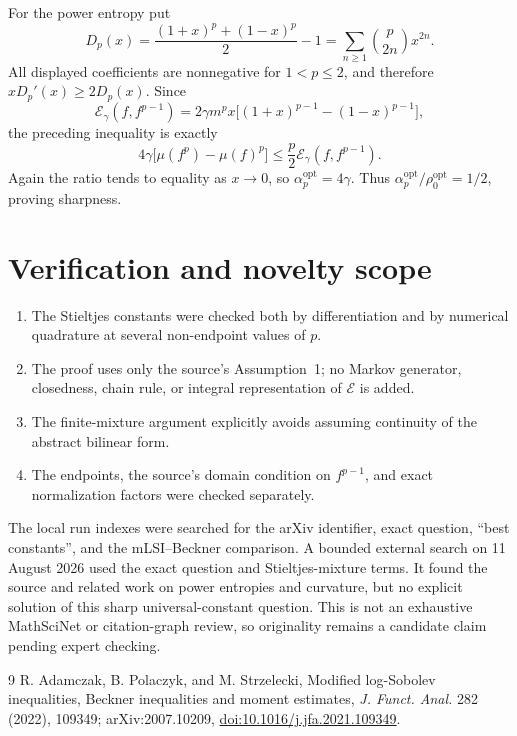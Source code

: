 \documentclass[11pt]{article}
\newcommand{\E}{\mathcal E}
\begin{document}
For the power entropy put
\[
 D_p(x)=\frac{(1+x)^p+(1-x)^p}{2}-1
 =\sum_{n\geq1}\binom p{2n}x^{2n}.
\]
All displayed coefficients are nonnegative for $1<p\leq2$, and therefore
$xD_p'(x)\geq2D_p(x)$. Since
\[
 \E_\gamma(f,f^{p-1})
 =2\gamma m^p x\bigl[(1+x)^{p-1}-(1-x)^{p-1}\bigr],
\]
the preceding inequality is exactly
\[
 4\gamma\bigl[\mu(f^p)-\mu(f)^p\bigr]
 \leq \frac p2\E_\gamma(f,f^{p-1}).
\]
Again the ratio tends to equality as $x\to0$, so
$\alpha_p^{\mathrm{opt}}=4\gamma$. Thus
$\alpha_p^{\mathrm{opt}}/\rho_0^{\mathrm{opt}}=1/2$, proving sharpness.

\section{Verification and novelty scope}

\begin{enumerate}[leftmargin=*,itemsep=0.35em]
 \item The Stieltjes constants were checked both by differentiation and by
 numerical quadrature at several non-endpoint values of $p$.
 \item The proof uses only the source's Assumption~1; no Markov generator,
 closedness, chain rule, or integral representation of $\E$ is added.
 \item The finite-mixture argument explicitly avoids assuming continuity of
 the abstract bilinear form.
 \item The endpoints, the source's domain condition on $f^{p-1}$, and exact
 normalization factors were checked separately.
\end{enumerate}

The local run indexes were searched for the arXiv identifier, exact question,
``best constants'', and the mLSI--Beckner comparison. A bounded external
search on 11 August 2026 used the exact question and Stieltjes-mixture terms.
It found the source and related work on power entropies and curvature, but no
explicit solution of this sharp universal-constant question. This is not an
exhaustive MathSciNet or citation-graph review, so originality remains a
candidate claim pending expert checking.

\begin{thebibliography}{9}
R. Adamczak, B. Polaczyk, and M. Strzelecki,
\newblock Modified log-Sobolev inequalities, Beckner inequalities and moment
estimates,
\newblock \emph{J. Funct. Anal.} 282 (2022), 109349;
arXiv:2007.10209,
\href{https://doi.org/10.1016/j.jfa.2021.109349}{doi:10.1016/j.jfa.2021.109349}.
\end{thebibliography}
\end{document}
